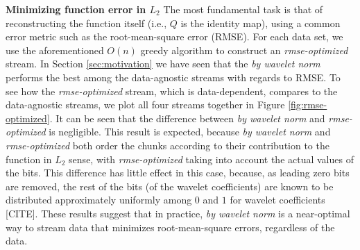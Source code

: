 \textbf{Minimizing function error in $L_2$} The most fundamental task is that of reconstructing the
function itself (i.e., $Q$ is the identity map), using a common error metric such as the
root-mean-square error (RMSE). For each data set, we use the aforementioned $O(n)$ greedy algorithm
to construct an \emph{rmse-optimized} stream. In Section \ref{sec:motivation} we have seen that the
\emph{by wavelet norm} performs the best among the data-agnostic streams with regards to RMSE. To
see how the \emph{rmse-optimized} stream, which is data-dependent, compares to the data-agnostic
streams, we plot all four streams together in Figure \ref{fig:rmse-optimized}. It can be seen that
the difference between \emph{by wavelet norm} and \emph{rmse-optimized} is negligible. This result
is expected, because \emph{by wavelet norm} and \emph{rmse-optimized} both order the chunks
according to their contribution to the function in $L_2$ sense, with \emph{rmse-optimized} taking
into account the actual values of the bits. This difference has little effect in this case, because,
as leading zero bits are removed, the rest of the bits (of the wavelet coefficients) are known to be
distributed approximately uniformly among $0$ and $1$ for wavelet coefficients [CITE]. These results
suggest that in practice, \emph{by wavelet norm} is a near-optimal way to stream data that minimizes
root-mean-square errors, regardless of the data.

